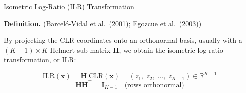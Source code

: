 \begin{frame}[t]{Isometric Log-Ratio (ILR) Transformation}

  \vspace{0.2cm}

  \textbf{Definition.} (Barcel\'{o}-Vidal et al.\ (2001); Egozcue et al.\ (2003))

  By projecting the CLR coordinates onto an orthonormal basis, usually with a $(K{-}1)\!\times\! K$ Helmert sub-matrix $\mathbf{H}$, we obtain the isometric log-ratio transformation, or ILR:

  \vspace{0.2cm}
  \[
    \mathrm{ILR}(\mathbf{x})
    = \mathbf{H}\;\mathrm{CLR}(\mathbf{x})
    = (z_1,\;z_2,\;\ldots,\;z_{K-1})
    \in\mathbb{R}^{K-1}
  \]
  \[
    \mathbf{H}\mathbf{H}^\top = \mathbf{I}_{K-1} \quad\text{(rows orthonormal)}
  \]


\end{frame}


